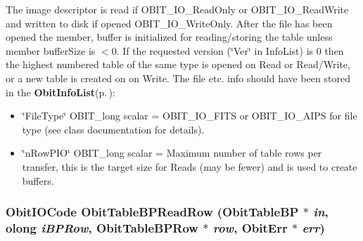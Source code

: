 The image descriptor is read if OBIT\_\-IO\_\-Read\-Only or OBIT\_\-IO\_\-Read\-Write and written to disk if opened OBIT\_\-IO\_\-Write\-Only. After the file has been opened the member, buffer is initialized for reading/storing the table unless member buffer\-Size is $<$0. If the requested version (\char`\"{}Ver\char`\"{} in Info\-List) is 0 then the highest numbered table of the same type is opened on Read or Read/Write, or a new table is created on on Write. The file etc. info should have been stored in the {\bf Obit\-Info\-List}{\rm (p.\,\pageref{structObitInfoList})}: \begin{itemize}
\item \char`\"{}File\-Type\char`\"{} OBIT\_\-long scalar = OBIT\_\-IO\_\-FITS or OBIT\_\-IO\_\-AIPS for file type (see class documentation for details). \item \char`\"{}n\-Row\-PIO\char`\"{} OBIT\_\-long scalar = Maximum number of table rows per transfer, this is the target size for Reads (may be fewer) and is used to create buffers. 
\end{itemize}
\subsubsection{\setlength{\rightskip}{0pt plus 5cm}Obit\-IOCode Obit\-Table\-BPRead\-Row ({\bf Obit\-Table\-BP} $\ast$ {\em in}, {\bf olong} {\em i\-BPRow}, {\bf Obit\-Table\-BPRow} $\ast$ {\em row}, {\bf Obit\-Err} $\ast$ {\em err})}\label{ObitTableBP_8c_a22}


